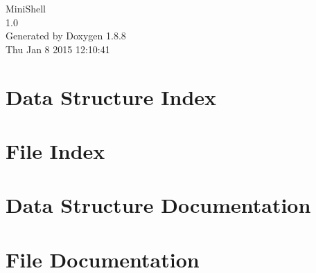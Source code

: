 \documentclass[twoside]{book}
\newcommand{\+}{\discretionary{\mbox{\scriptsize$\hookleftarrow$}}{}{}}
\newcommand{\clearemptydoublepage}{%
  \newpage{\pagestyle{empty}\cleardoublepage}%
}
\begin{document}
\hypersetup{pageanchor=false,
             bookmarks=true,
             bookmarksnumbered=true,
             pdfencoding=unicode
            }
\begin{titlepage}
\vspace*{7cm}
\begin{center}%
{\Large Mini\+Shell \\[1ex]\large 1.\+0 }\\
\vspace*{1cm}
{\large Generated by Doxygen 1.8.8}\\
\vspace*{0.5cm}
{\small Thu Jan 8 2015 12:10:41}\\
\end{center}
\end{titlepage}
\clearemptydoublepage
\tableofcontents
\clearemptydoublepage
{}
\hypersetup{pageanchor=true}

\chapter{Data Structure Index}

\chapter{File Index}

\chapter{Data Structure Documentation}





\chapter{File Documentation}



































\newpage
{}
{}
\printindex
\end{document}
